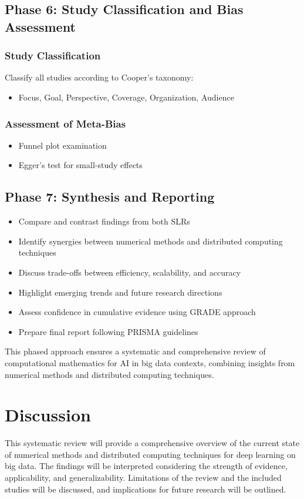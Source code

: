 \documentclass[a4paper,12pt]{article}
\begin{document}
\subsection{Phase 6: Study Classification and Bias Assessment}

\subsubsection{Study Classification}
Classify all studies according to Cooper's taxonomy:
\begin{itemize}
    \item Focus, Goal, Perspective, Coverage, Organization, Audience
\end{itemize}

\subsubsection{Assessment of Meta-Bias}
\begin{itemize}
    \item Funnel plot examination
    \item Egger's test for small-study effects
\end{itemize}

\subsection{Phase 7: Synthesis and Reporting}

\begin{itemize}
    \item Compare and contrast findings from both SLRs
    \item Identify synergies between numerical methods and distributed computing techniques
    \item Discuss trade-offs between efficiency, scalability, and accuracy
    \item Highlight emerging trends and future research directions
    \item Assess confidence in cumulative evidence using GRADE approach
    \item Prepare final report following PRISMA guidelines
\end{itemize}

This phased approach ensures a systematic and comprehensive review of computational mathematics for AI in big data contexts, combining insights from numerical methods and distributed computing techniques.

\section{Discussion}
This systematic review will provide a comprehensive overview of the current state of numerical methods and distributed computing techniques for deep learning on big data. The findings will be interpreted considering the strength of evidence, applicability, and generalizability. Limitations of the review and the included studies will be discussed, and implications for future research will be outlined.
\end{document}
